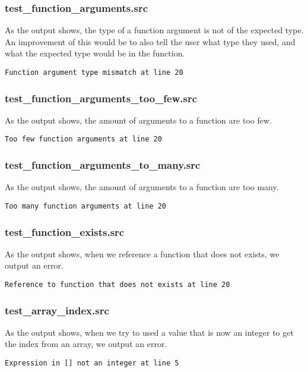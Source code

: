 \documentclass[a4paper,10pt,titlepage]{report}
\begin{document}
\subsubsection{test\_function\_arguments.src}
As the output shows, the type of a function argument is not of the expected type. An improvement of this would be to also tell the user what type they used, and what the expected type would be in the function.
\begin{lstlisting}
Function argument type mismatch at line 20
\end{lstlisting}

\subsubsection{test\_function\_arguments\_too\_few.src}
As the output shows, the amount of arguments to a function are too few.
\begin{lstlisting}
Too few function arguments at line 20
\end{lstlisting}

\subsubsection{test\_function\_arguments\_to\_many.src}
As the output shows, the amount of arguments to a function are too many.
\begin{lstlisting}
Too many function arguments at line 20
\end{lstlisting}

\subsubsection{test\_function\_exists.src}
As the output shows, when we reference a function that does not exists, we output an error.
\begin{lstlisting}
Reference to function that does not exists at line 20
\end{lstlisting}

\subsubsection{test\_array\_index.src}
As the output shows, when we try to used a value that is now an integer to get the index from an array, we output an error.
\begin{lstlisting}
Expression in [] not an integer at line 5
\end{lstlisting}
\end{document}
